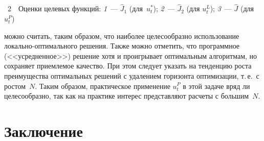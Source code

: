 \begin{figure} %
 \vspace*{1pt}
 \begin{center}
 \mbox{%
 \epsfxsize=157.746mm
 }
 \end{center}
 \vspace*{-9pt}
\vspace*{9pt}
\end{figure}

\begin{multicols}{2}

\begin{center} %
\vspace*{2pt}
\mbox{%
  \epsfxsize=72.509mm
}
\end{center}
\vspace*{3pt}
{{\figurename~2}\ \ \small{Оценки целевых функций: \textit{1}~--- $\hat{J}_1$ 
(для~$u_t^*$); \textit{2}~--- $\hat{J}_2$ (для 
$u_t^L$); \textit{3}~--- $\hat{J}$ (для $u_t^P$)}}
\vspace*{24pt}

\addtocounter{figure}{1}

\noindent
можно считать, таким образом, что наиболее целесообразно использование 
ло\-каль\-но-оп\-ти\-маль\-но\-го решения. Также можно отметить, что
 программное 
(<<усредненное>>) решение хотя и проигрывает оптимальным алгоритмам, но сохраняет 
приемлемое качество. При этом следует указать на тенденцию роста преимущества 
оптимальных решений с удалением горизонта оптимизации, т.\,е.\ с ростом~$N$. Таким 
образом, практическое применение $u_t^P$ в этой задаче вряд ли целесообразно, так как на 
практике интерес представляют расчеты с большим~$N$.

\section{Заключение}
  

\end{multicols}
